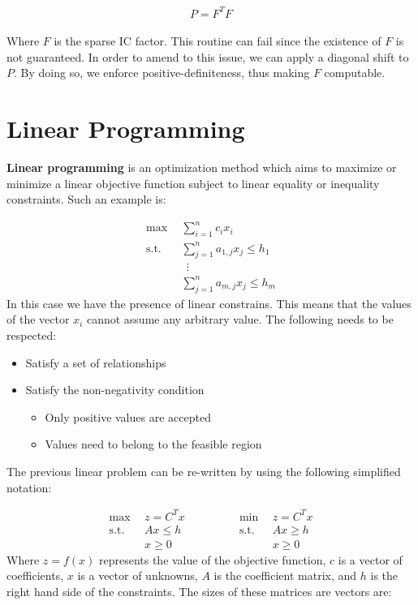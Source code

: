 \documentclass{article}
\begin{document}
\[ P = F^TF \] \\
Where $F$ is the sparse IC factor. This routine can fail since the existence of $F$ is not guaranteed. In order to amend to this issue, we can apply a diagonal shift to $P$. By doing so, we enforce positive-definiteness, thus making $F$ computable.

\section{Linear Programming}
\textbf{Linear programming} is an optimization method which aims to maximize or minimize a linear objective function subject to linear equality or inequality constraints. Such an example is:

\begin{align*}
	\max~~ & \sum_{i = 1}^n c_ix_i \\
	\text{s.t.}~~ & \sum_{j = 1}^n a_{1,j}x_j \leq h_1 \\
	~~&~~ \vdots \\
	~~& \sum_{j = 1}^n a_{m,j}x_j \leq h_m
\end{align*}
In this case we have the presence of linear constrains. This means that the values of the vector $x_i$ cannot assume any arbitrary value. The following needs to be respected:

\begin{itemize}
	\item Satisfy a set of relationships
	\item Satisfy the non-negativity condition
	\begin{itemize}
		\item Only positive values are accepted
		\item Values need to belong to the feasible region
	\end{itemize}
\end{itemize}
The previous linear problem can be re-written by using the following simplified notation:

\begin{equation*}
  \begin{split}
    \max~~ & z = C^Tx \\
	\text{s.t.}~~ & Ax \leq h \\
	~~& x \geq 0
  \end{split}
\quad\quad\quad\quad
  \begin{split}
    \min~~ & z = C^Tx \\
	\text{s.t.}~~ & Ax \geq h \\
	~~& x \geq 0
  \end{split}
\end{equation*}
Where $z = f(x)$ represents the value of the objective function, $c$ is a vector of coefficients, $x$ is a vector of unknowns, $A$ is the coefficient matrix, and $h$ is the right hand side of the constraints. The sizes of these matrices are vectors are:
\end{document}

